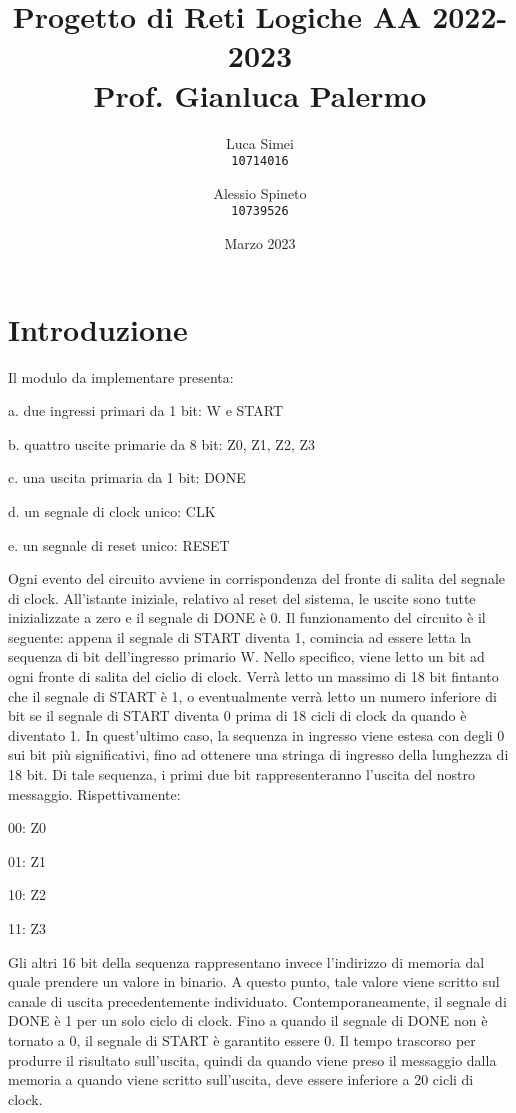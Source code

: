 \documentclass{article}
\title{\textbf{Progetto di Reti Logiche AA 2022-2023}\\
    \large{Prof. Gianluca Palermo}
}
\author{Luca Simei\\
\texttt{10714016}
\and
Alessio Spineto\\
\texttt{10739526}
}
\date{Marzo 2023}
\begin{document}
\maketitle

\tableofcontents

\section{Introduzione}
Il modulo da implementare presenta:

a. due ingressi primari da 1 bit: W e START

b. quattro uscite primarie da 8 bit: Z0, Z1, Z2, Z3

c. una uscita primaria da 1 bit: DONE

d. un segnale di clock unico: CLK

e. un segnale di reset unico: RESET

\noindent Ogni evento del circuito avviene in corrispondenza del fronte di salita del segnale di clock. All'istante iniziale, relativo al reset del sistema, le uscite sono tutte inizializzate a zero e il segnale di DONE è 0. Il funzionamento del circuito è il seguente: appena il segnale di START diventa 1, comincia ad essere letta la sequenza di bit dell'ingresso primario W. Nello specifico, viene letto un bit ad ogni fronte di salita del ciclio di clock. Verrà letto un massimo di 18 bit fintanto che il segnale di START è 1, o eventualmente verrà letto un numero inferiore di bit se il segnale di START diventa 0 prima di 18 cicli di clock da quando è diventato 1. In quest'ultimo caso, la sequenza in ingresso viene estesa con degli 0 sui bit più significativi, fino ad ottenere una stringa di ingresso della lunghezza di 18 bit. Di tale sequenza, i primi due bit rappresenteranno l'uscita del nostro messaggio. Rispettivamente:

00: Z0

01: Z1

10: Z2

11: Z3

\noindent Gli altri 16 bit della sequenza rappresentano invece l'indirizzo di memoria dal quale prendere un valore in binario. A questo punto, tale valore viene scritto sul canale di uscita precedentemente individuato. Contemporaneamente, il segnale di DONE è 1 per un solo ciclo di clock. Fino a quando il segnale di DONE non è tornato a 0, il segnale di START è garantito essere 0. Il tempo trascorso per produrre il risultato sull'uscita, quindi da quando viene preso il messaggio dalla memoria a quando viene scritto sull'uscita, deve essere inferiore a 20 cicli di clock.
\end{document}
